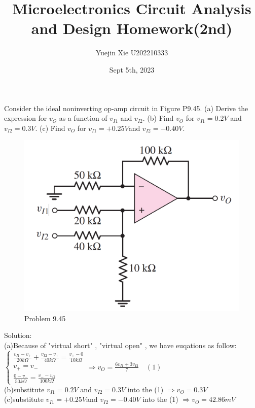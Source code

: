 \documentclass[a4paper,11pt,UTF8]{article}
\title{Microelectronics Circuit Analysis and Design Homework(2nd)}
\author{Yuejin Xie \quad U202210333}
\date{Sept 5th, 2023 }
\begin{document}
	\maketitle
{} Consider the ideal noninverting op-amp circuit in Figure P9.45. (a) Derive
the expression for $v_O$ as a function of $v_{I 1} $ and $ v_{I 2}$. (b) Find $v_O$ for
$v_{I 1} = 0.2V$ and $v_{I 2} = 0.3V$. (c) Find $v_O$ for $v_{I 1} = +0.25V $and $v_{I 2}=-0.40V$.
\begin{figure}[H] %
	\centering %
	\includegraphics[scale=0.15]{MD9.45.png} %
	\caption{Problem 9.45}
\end{figure}
\noindent Solution:\\
(a)Because of "virtual short" , "virtual open" , we have euqations as follow:\\
$\begin{cases}
	\displaystyle\frac{v_{I 1}-v_+}{20k\Omega}+\frac{v_{I 2}-v_+}{40k\Omega}=\frac{v_+-0}{10k\Omega}\\
	\displaystyle v_+=v_-\\
	\displaystyle\frac{0-v_-}{50k\Omega}=\frac{v_--v_O}{100k\Omega}
\end{cases}\Rightarrow \displaystyle v_O=\frac{6v_{I 1}+3v_{I 2}}{7} \quad(1)$\\
(b)substitute $v_{I 1} = 0.2V$ and $v_{I 2} = 0.3V$ into the (1) $\Rightarrow v_O=0.3 V$\\
(c)substitute $v_{I 1} = +0.25V $and $v_{I 2}=-0.40V$ into the (1) $\Rightarrow v_O= 42.86 mV$\\
\end{document}
